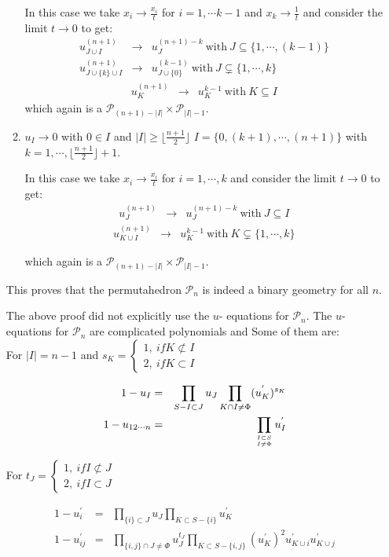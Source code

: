 \documentclass[hidelinks,12pt]{article}
\newcommand{\bea}[1]{\begin{eqnarray}\label{#1} }
\newcommand{\eea}{\end{eqnarray}}
\def\bea{\begin{eqnarray}}
\def\eea{\end{eqnarray}}
\begin{document}
\begin{enumerate}
\begin{enumerate}
    In this case we take $x_i \rightarrow \frac{ x_i}{t}$ for $i=1,\cdots k-1$ and $x_{k} \rightarrow \frac{1}{t}$ and  consider the limit $t \rightarrow 0$ to get:
    \bea
    u^{(n+1)}_{J \cup I } &\rightarrow& u_{J}^{(n+1)-k} ~\text{with}~ J\subseteq \{1,\cdots,(k-1)\}\\
     u^{(n+1)}_{J \cup \{k\}\cup I} &\rightarrow& u_{J \cup\{0\}}^{(k-1)} ~\text{with}~ J\subsetneq \{1 ,\cdots, k\}
    \eea
     \bea
    u^{(n+1)}_{K} &\rightarrow& u_{K}^{k-1} ~\text{with}~ K\subseteq I
    \eea
    which again is a $\mathscr P_{(n+1)-|I|} \times \mathscr P_{|I|-1}$. 
    \item $u_I \rightarrow 0$ with $0\in I$ and $|I| \ge \lfloor \frac{n+1}{2} \rfloor$ $I = \{0,(k+1),\cdots,(n+1)\}$ with $k= 1,\cdots, \lfloor \frac{n+1}{2} \rfloor+1$.
    
    In this case we take $x_i \rightarrow \frac{x_i}{t}$ for $i=1,\cdots, k$ and consider the limit $t \rightarrow 0$ to get:
    \bea
    u^{(n+1)}_{J} &\rightarrow& u_{J}^{(n+1)-k} ~\text{with}~ J\subseteq I
    \eea
     \bea
    u^{(n+1)}_{K \cup I} &\rightarrow& u_{K}^{k-1} ~\text{with}~ K\subsetneq \{1,\cdots,k\}
    \eea
    
     which again is a $\mathscr P_{(n+1)-|I|} \times \mathscr P_{|I|-1}$. 
\end{enumerate}
This proves that the permutahedron $\mathscr P_n$ is indeed a binary geometry for all $n$.

The above proof did not explicitly use the $u$- equations for $\mathscr P_n$. 
The $u$-equations for $\mathscr P_n$ are complicated polynomials and Some of them are:\\

For $|I| =n-1$ and $s_K = \begin{cases}  1,~ if K \not\subset I & \\ 2, ~if K \subset I\end{cases}$

\bea
1-u_{I} &=& \prod_ {S - I \subset J } u_{J} \prod_ {K \cap I \ne \Phi } (u^{'}_{K})^{s_K}  \nonumber \\
1-u_{12\cdots n} &=& \prod_ {{I \subset S}\atop {I \ne \Phi}} u^{'}_{I} \nonumber
\eea

For $t_J = \begin{cases}  1,~ if I  \not\subset J & \\ 2, ~if I \subset J \end{cases}$

\bea
1-u^{'}_{i} &=& \prod_ {\{ i \} \subset J } u_{J} \prod_ {K \subset S- \{i\} } u^{'}_{K} \nonumber \\
1-u^{'}_{i j} &=& \prod_ {\{i,j \}\cap J \ne \Phi} u^{t_J}_{J} \prod_ {K \subset S-\{i, j \} } (u^{'}_{K})^{2} u^{'}_{K \cup {i}} u^{'}_{K \cup{j} } \nonumber 
\eea


\end{enumerate}
\end{document}
